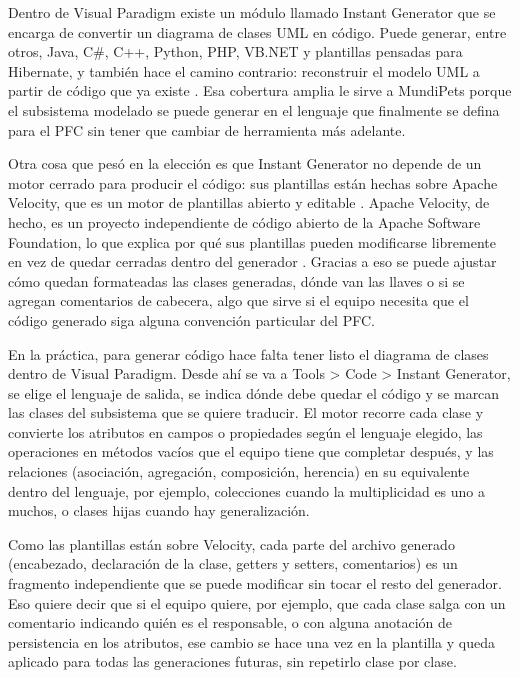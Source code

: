 \documentclass[journal,onecolumn]{IEEEtran}
\begin{document}
	Dentro de Visual Paradigm existe un módulo llamado Instant Generator que se encarga de convertir un diagrama de clases UML en código. Puede generar, entre otros, Java, C\#, C++, Python, PHP, VB.NET y plantillas pensadas para Hibernate, y también hace el camino contrario: reconstruir el modelo UML a partir de código que ya existe \cite{vp_instantgen}. Esa cobertura amplia le sirve a MundiPets porque el subsistema modelado se puede generar en el lenguaje que finalmente se defina para el PFC sin tener que cambiar de herramienta más adelante.
	
	Otra cosa que pesó en la elección es que Instant Generator no depende de un motor cerrado para producir el código: sus plantillas están hechas sobre Apache Velocity, que es un motor de plantillas abierto y editable \cite{vp_userguide}. Apache Velocity, de hecho, es un proyecto independiente de código abierto de la Apache Software Foundation, lo que explica por qué sus plantillas pueden modificarse libremente en vez de quedar cerradas dentro del generador \cite{apache_velocity}. Gracias a eso se puede ajustar cómo quedan formateadas las clases generadas, dónde van las llaves o si se agregan comentarios de cabecera, algo que sirve si el equipo necesita que el código generado siga alguna convención particular del PFC.
	
	En la práctica, para generar código hace falta tener listo el diagrama de clases dentro de Visual Paradigm. Desde ahí se va a Tools \textgreater{} Code \textgreater{} Instant Generator, se elige el lenguaje de salida, se indica dónde debe quedar el código y se marcan las clases del subsistema que se quiere traducir. El motor recorre cada clase y convierte los atributos en campos o propiedades según el lenguaje elegido, las operaciones en métodos vacíos que el equipo tiene que completar después, y las relaciones (asociación, agregación, composición, herencia) en su equivalente dentro del lenguaje, por ejemplo, colecciones cuando la multiplicidad es uno a muchos, o clases hijas cuando hay generalización.
	
	Como las plantillas están sobre Velocity, cada parte del archivo generado (encabezado, declaración de la clase, getters y setters, comentarios) es un fragmento independiente que se puede modificar sin tocar el resto del generador. Eso quiere decir que si el equipo quiere, por ejemplo, que cada clase salga con un comentario indicando quién es el responsable, o con alguna anotación de persistencia en los atributos, ese cambio se hace una vez en la plantilla y queda aplicado para todas las generaciones futuras, sin repetirlo clase por clase.
	
\end{document}
